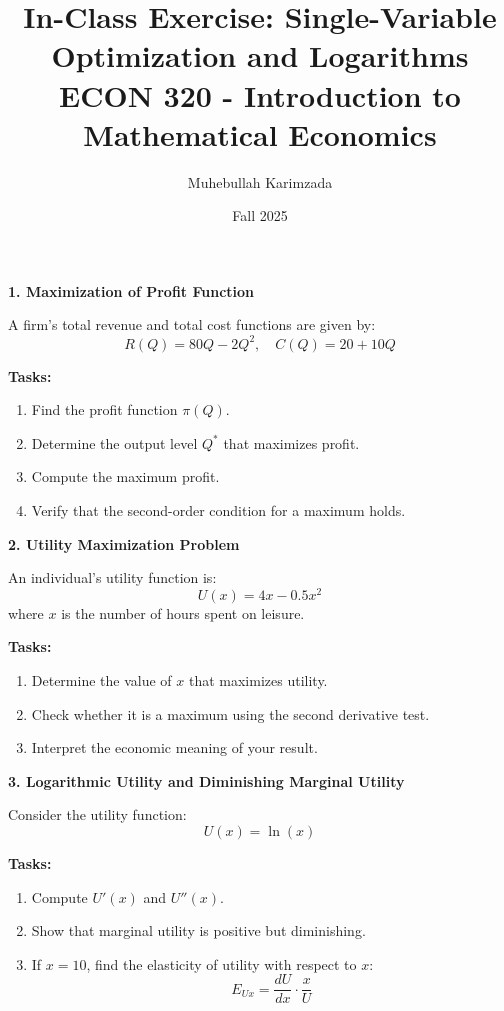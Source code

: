 \documentclass[12pt]{article}
\title{In-Class Exercise: Single-Variable Optimization and Logarithms\\[7pt]
\large ECON 320 - Introduction to Mathematical Economics}
\author{Muhebullah Karimzada}
\date{Fall 2025}
\begin{document}
\maketitle

\vspace{1em}

\textbf{1. Maximization of Profit Function}

A firm's total revenue and total cost functions are given by:
\[
R(Q) = 80Q - 2Q^2, \quad C(Q) = 20 + 10Q
\]

\textbf{Tasks:}
\begin{enumerate}
  \item Find the profit function \( \pi(Q) \).
  \item Determine the output level \( Q^* \) that maximizes profit.
  \item Compute the maximum profit.
  \item Verify that the second-order condition for a maximum holds.
\end{enumerate}

\vspace{1em}

\textbf{2. Utility Maximization Problem}

An individual's utility function is:
\[
U(x) = 4x - 0.5x^2
\]
where \( x \) is the number of hours spent on leisure.

\textbf{Tasks:}
\begin{enumerate}
  \item Determine the value of \( x \) that maximizes utility.
  \item Check whether it is a maximum using the second derivative test.
  \item Interpret the economic meaning of your result.
\end{enumerate}

\vspace{1em}
\newpage
\textbf{3. Logarithmic Utility and Diminishing Marginal Utility}

Consider the utility function:
\[
U(x) = \ln(x)
\]

\textbf{Tasks:}
\begin{enumerate}
  \item Compute \( U'(x) \) and \( U''(x) \).
  \item Show that marginal utility is positive but diminishing.
  \item If \( x = 10 \), find the elasticity of utility with respect to \( x \):
  \[
  E_{Ux} = \frac{dU}{dx} \cdot \frac{x}{U}
  \]
\end{enumerate}
\end{document}
